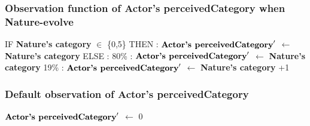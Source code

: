 \documentclass{article}%
\begin{document}
\subsubsection{Observation function of Actor's perceivedCategory when Nature{-}evolve}%
\label{ssubsec:Observation function of Actor's perceivedCategory when Nature{-}evolve}%
\begin{flushleft}%
IF %
\textbf{Nature's category}%
$\in$%
\{0,5\}%
\linebreak%
\hspace*{2em}%
THEN %
: %
$\mbox{\textbf{Actor's perceivedCategory}} '$%
$\leftarrow$%
\textbf{Nature's category}%
\linebreak%
\hspace*{2em}%
ELSE %
: %
\linebreak%
\hspace*{4em}%
80\%%
: %
$\mbox{\textbf{Actor's perceivedCategory}} '$%
$\leftarrow$%
\textbf{Nature's category}%
\linebreak%
\hspace*{4em}%
19\%%
: %
$\mbox{\textbf{Actor's perceivedCategory}} '$%
$\leftarrow$%
\textbf{Nature's category}%
+1%
\end{flushleft}

%
\subsubsection{Default observation of Actor's perceivedCategory}%
\label{ssubsec:Default observation of Actor's perceivedCategory}%
\begin{flushleft}%
$\mbox{\textbf{Actor's perceivedCategory}} '$%
$\leftarrow$%
0%
\end{flushleft}

%
\end{document}
